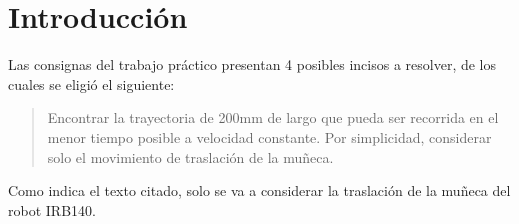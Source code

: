 \section{Introducción}

Las consignas del trabajo práctico presentan 4 posibles incisos a resolver, de los cuales se eligió el siguiente:

\begin{tcolorbox}[colback=gray!10, colframe=black, title=Trayectoria recta más rápida]
\begin{quote}
	Encontrar la trayectoria de 200mm de largo que pueda ser recorrida en el menor tiempo posible a velocidad constante. Por simplicidad, considerar solo el movimiento de traslación de la muñeca.
\end{quote}
\end{tcolorbox}

Como indica el texto citado, solo se va a considerar la traslación de la muñeca del robot IRB140.
